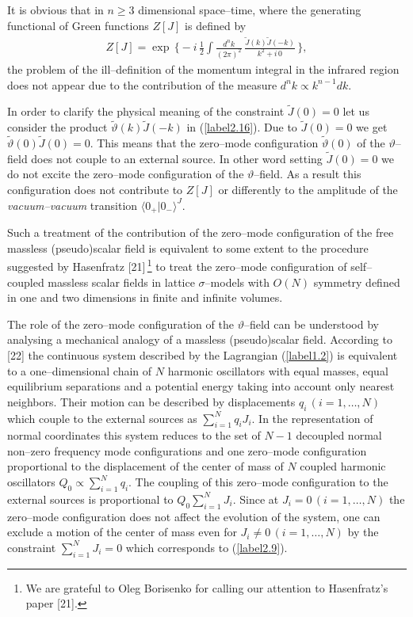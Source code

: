 \documentclass[a4paper,12pt] {article}
\begin{document}
It is obvious that in $n\ge 3$ dimensional space--time, where the
generating functional of Green functions $Z[J]$ is defined by
%
\begin{eqnarray}\label{label2.19}
Z[J]= \exp\,\Big\{- i\,\frac{1}{2}\int
\frac{d^nk}{(2\pi)^2}\,\frac{\tilde{J}(k)\tilde{J}(-k)}{k^2 +
i\,0}\,\Big\},
\end{eqnarray}
%
the problem of the ill--definition of the momentum integral in the
infrared region does not appear due to the contribution of the measure
$d^nk \propto k^{n-1}dk$.

In order to clarify the physical meaning of the constraint
$\tilde{J}(0) = 0$ let us consider the product
$\tilde{\vartheta}(k)\tilde{J}(-k)$ in (\ref{label2.16}). Due to
$\tilde{J}(0) = 0$ we get $\tilde{\vartheta}(0)\tilde{J}(0) = 0$. This
means that the zero--mode configuration $\tilde{\vartheta}(0)$ of the
$\vartheta$--field does not couple to an external source. In other
word setting $\tilde{J}(0) = 0$ we do not excite the zero--mode
configuration of the $\vartheta$--field. As a result this
configuration does not contribute to $Z[J]$ or differently to the
amplitude of the {\it vacuum--vacuum} transition $\langle
0_+|0_-\rangle^J$.

Such a treatment of the contribution of the zero--mode configuration
of the free massless (pseudo)scalar field is equivalent to some extent
to the procedure suggested by Hasenfratz [21]\,\footnote{We are
grateful to Oleg Borisenko for calling our attention to Hasenfratz's
paper [21].}  to treat the zero--mode configuration of self--coupled
massless scalar fields in lattice $\sigma$--models with $O(N)$
symmetry defined in one and two dimensions in finite and infinite
volumes.

The role of the zero--mode configuration of the $\vartheta$--field can
be understood by analysing a mechanical analogy of a massless
(pseudo)scalar field. According to [22] the continuous system
described by the Lagrangian (\ref{label1.2}) is equivalent to a
one--dimensional chain of $N$ harmonic oscillators with equal masses,
equal equilibrium separations and a potential energy taking into
account only nearest neighbors. Their motion can be described by
displacements $q_i\,(i=1,\ldots, N)$ which couple to the external
sources as $\sum^N_{i=1}q_iJ_i$. In the representation of normal
coordinates this system reduces to the set of $N-1$ decoupled normal
non--zero frequency mode configurations and one zero--mode
configuration proportional to the displacement of the center of mass
of $N$ coupled harmonic oscillators $Q_0 \propto \sum^N_{i=1}q_i$. The
coupling of this zero--mode configuration to the external sources is
proportional to $Q_0\sum^N_{i=1}J_i$. Since at $J_i = 0\,(i =
1,\ldots,N)$ the zero--mode configuration does not affect the
evolution of the system, one can exclude a motion of the center of
mass even for $J_i \neq 0\,(i = 1,\ldots,N)$ by the constraint
$\sum^N_{i=1}J_i = 0$ which corresponds to (\ref{label2.9}).  
\end{document}
